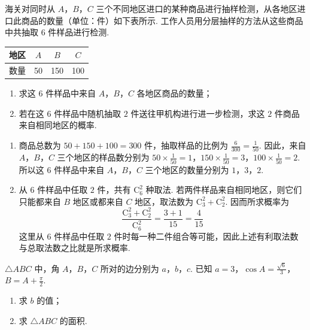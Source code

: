 \begin{problem}
海关对同时从 \(A\)，\(B\)，\(C\) 三个不同地区进口的某种商品进行抽样检测，从各地区进口此商品的数量（单位：\(\text{件}\)）如下表所示. 工作人员用分层抽样的方法从这些商品中共抽取 \(6\text{ 件}\)样品进行检测.

\begin{center}
\begin{tabular}{c|c|c|c}
\hline
地区 & \(A\) & \(B\) & \(C\) \\
\hline
数量 & 50 & 150 & 100 \\
\hline
\end{tabular}
\end{center}

\begin{enumerate}
\item 求这 \(6\text{ 件}\)样品中来自 \(A\)，\(B\)，\(C\) 各地区商品的数量；
\item 若在这 \(6\text{ 件}\)样品中随机抽取 \(2\text{ 件}\)送往甲机构进行进一步检测，求这 \(2\text{ 件}\)商品来自相同地区的概率.
\end{enumerate}
\end{problem}

\begin{solution}
\begin{enumerate}
\item 商品总数为 \(50+150+100=300\text{ 件}\)，抽取样品的比例为 \(\frac{6}{300}=\frac{1}{50}\). 因此，来自 \(A\)，\(B\)，\(C\) 三个地区的样品数分别为
\(50\times\frac1{50}=1\)，\(150\times\frac1{50}=3\)，\(100\times\frac1{50}=2\).
所以这 \(6\) 件样品中来自 \(A\)，\(B\)，\(C\) 三个地区的数量分别为 \(1\)，\(3\)，\(2\).

\item 从 \(6\) 件样品中任取 \(2\) 件，共有 \(\mathrm C_{6}^{2}\) 种取法. 若两件样品来自相同地区，则它们只能都来自 \(B\) 地区或都来自 \(C\) 地区，取法数为 \(\mathrm C_{3}^{2}+\mathrm C_{2}^{2}\). 因而所求概率为
\[
\frac{\mathrm C_{3}^{2}+\mathrm C_{2}^{2}}{\mathrm C_{6}^{2}}=\frac{3+1}{15}=\frac4{15}
\]
这里从 \(6\) 件样品中任取 \(2\) 件时每一种二件组合等可能，因此上述有利取法数与总取法数之比就是所求概率.
\end{enumerate}
\end{solution}

\begin{problem}
\(\triangle ABC\) 中，角 \(A\)，\(B\)，\(C\) 所对的边分别为 \(a\)，\(b\)，\(c\). 已知 \(a = 3\)，\(\cos A = \frac{\sqrt{6}}{3}\)，\(B = A + \frac{\pi}{2}\).

\begin{enumerate}
\item 求 \(b\) 的值；
\item 求 \(\triangle ABC\) 的面积.
\end{enumerate}
\end{problem}

